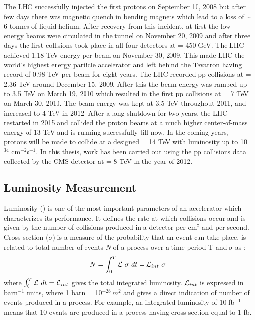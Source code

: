 The LHC successfully injected the first protons on September 10, 2008 but after few days there was magnetic quench in bending magnets which lead to a loss of $\sim$6 tonnes of liquid helium. After recovery from this incident, at first the low-energy beams were circulated in the tunnel on November 20, 2009 and after three days the first collisions took place in all four detectors at \cme = 450 GeV. The LHC achieved 1.18 TeV energy per beam on November 30, 2009. This made LHC the world’s highest energy particle accelerator and left behind the Tevatron having record of 0.98 TeV per beam for eight years. The LHC recorded pp collisions at \cme = 2.36 TeV around December 15, 2009. After this the beam energy was ramped up to 3.5 TeV on March 19, 2010 which resulted in the first pp collisions at \cme = 7 TeV on March 30, 2010. The beam energy was kept at 3.5 TeV throughout 2011, and increased to 4 TeV in 2012. After a long shutdown for two years, the LHC restarted in 2015 and collided the proton beams at a much higher center-of-mass energy of 13 TeV and is running successfully till now. In the coming years, protons will be made to collide at a designed \cme = 14 TeV with luminosity up to 10$^{34}$ cm$^{-2}$s$^{-1}$. In this thesis, work has been carried out using the pp collisions data collected by the CMS detector at \cme = 8 TeV in the year of 2012.

\subsection{Luminosity Measurement}
\label{sec:lumi}
Luminosity (\lumi) is one of the most important parameters of an accelerator which characterizes its performance. It defines the rate at which collisions occur and is given by the number of collisions produced in a detector per cm$^2$ and per second. Cross-section ($\sigma$) is a measure of the probability that an event can take place. \lumi is related to total number of events $N$ of a process over a time period T and $\sigma$ as :
\begin{equation}
N = \int_{0}^{T} \mathcal{L}~\sigma~dt = \mathcal{L}_{int}~\sigma
\end{equation}
where $\int_{0}^{T} \mathcal{L}~dt = \mathcal{L}_{int}$ gives the total integrated luminosity. $\mathcal{L}_{int}$ is expressed in barn$^{-1}$ units, where 1 barn = 10$^{-28}~m^2$ and gives a direct indication of number of events produced in a process. For example, an integrated luminosity of 10 fb$^{-1}$ means that 10 events are produced in a process having cross-section equal to 1 fb.

